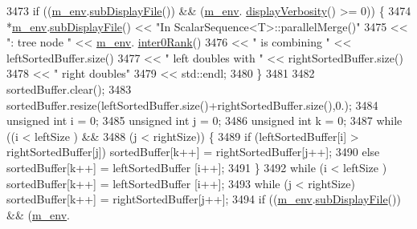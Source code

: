 \begin{DoxyCode}
3473       \textcolor{keywordflow}{if} ((\hyperlink{class_q_u_e_s_o_1_1_scalar_sequence_a71618cd6351b29361b437af68447a4c8}{m\_env}.\hyperlink{class_q_u_e_s_o_1_1_base_environment_a8a0064746ae8dddfece4229b9ad374d6}{subDisplayFile}()) && (\hyperlink{class_q_u_e_s_o_1_1_scalar_sequence_a71618cd6351b29361b437af68447a4c8}{m\_env}.
      \hyperlink{class_q_u_e_s_o_1_1_base_environment_a1fe5f244fc0316a0ab3e37463f108b96}{displayVerbosity}() >= 0)) \{
3474         *\hyperlink{class_q_u_e_s_o_1_1_scalar_sequence_a71618cd6351b29361b437af68447a4c8}{m\_env}.\hyperlink{class_q_u_e_s_o_1_1_base_environment_a8a0064746ae8dddfece4229b9ad374d6}{subDisplayFile}() << \textcolor{stringliteral}{"In ScalarSequence<T>::parallelMerge()"}
3475                                 << \textcolor{stringliteral}{": tree node "}        << \hyperlink{class_q_u_e_s_o_1_1_scalar_sequence_a71618cd6351b29361b437af68447a4c8}{m\_env}.
      \hyperlink{class_q_u_e_s_o_1_1_base_environment_ae106b5bb8a80b655b88b3a26b1e7c185}{inter0Rank}()
3476                                 << \textcolor{stringliteral}{" is combining "}      << leftSortedBuffer.size()
3477                                 << \textcolor{stringliteral}{" left doubles with "} << rightSortedBuffer.size()
3478                                 << \textcolor{stringliteral}{" right doubles"}
3479                                 << std::endl;
3480       \}
3481 
3482       sortedBuffer.clear();
3483       sortedBuffer.resize(leftSortedBuffer.size()+rightSortedBuffer.size(),0.);
3484       \textcolor{keywordtype}{unsigned} \textcolor{keywordtype}{int} i = 0;
3485       \textcolor{keywordtype}{unsigned} \textcolor{keywordtype}{int} j = 0;
3486       \textcolor{keywordtype}{unsigned} \textcolor{keywordtype}{int} k = 0;
3487       \textcolor{keywordflow}{while} ((i < leftSize ) &&
3488              (j < rightSize)) \{
3489         \textcolor{keywordflow}{if} (leftSortedBuffer[i] > rightSortedBuffer[j]) sortedBuffer[k++] = rightSortedBuffer[j++];
3490         \textcolor{keywordflow}{else}                                            sortedBuffer[k++] = leftSortedBuffer [i++];
3491       \}
3492       \textcolor{keywordflow}{while} (i < leftSize ) sortedBuffer[k++] = leftSortedBuffer [i++];
3493       \textcolor{keywordflow}{while} (j < rightSize) sortedBuffer[k++] = rightSortedBuffer[j++];
3494       \textcolor{keywordflow}{if} ((\hyperlink{class_q_u_e_s_o_1_1_scalar_sequence_a71618cd6351b29361b437af68447a4c8}{m\_env}.\hyperlink{class_q_u_e_s_o_1_1_base_environment_a8a0064746ae8dddfece4229b9ad374d6}{subDisplayFile}()) && (\hyperlink{class_q_u_e_s_o_1_1_scalar_sequence_a71618cd6351b29361b437af68447a4c8}{m\_env}.

\end{DoxyCode}
